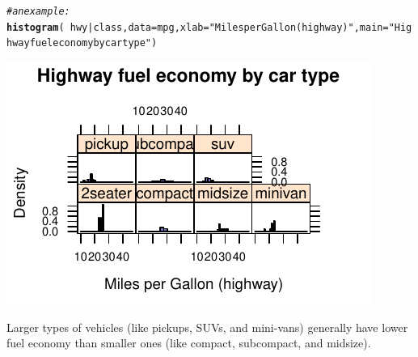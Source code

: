 \documentclass[twoside]{book}\usepackage[]{graphicx}\usepackage[]{xcolor}
\makeatletter
\def\maxwidth{ %
  \ifdim\Gin@nat@width>\linewidth
    \linewidth
  \else
    \Gin@nat@width
  \fi
}
\newcommand{\hlstr}[1]{\textcolor[rgb]{0.192,0.494,0.8}{#1}}%
\newcommand{\hlcom}[1]{\textcolor[rgb]{0.678,0.584,0.686}{\textit{#1}}}%
\newcommand{\hlopt}[1]{\textcolor[rgb]{0,0,0}{#1}}%
\newcommand{\hlstd}[1]{\textcolor[rgb]{0.345,0.345,0.345}{#1}}%
\newcommand{\hlkwc}[1]{\textcolor[rgb]{0.333,0.667,0.333}{#1}}%
\newcommand{\hlkwd}[1]{\textcolor[rgb]{0.737,0.353,0.396}{\textbf{#1}}}%
\newenvironment{kframe}{%
 \def\at@end@of@kframe{}%
 \ifinner\ifhmode%
  \def\at@end@of@kframe{\end{minipage}}%
  \begin{minipage}{\columnwidth}%
 \fi\fi%
 \def\FrameCommand##1{\hskip\@totalleftmargin \hskip-\fboxsep
 \colorbox{shadecolor}{##1}\hskip-\fboxsep
     \hskip-\linewidth \hskip-\@totalleftmargin \hskip\columnwidth}%
 \MakeFramed {\advance\hsize-\width
   \@totalleftmargin\z@ \linewidth\hsize
   \@setminipage}}%
 {\par\unskip\endMakeFramed%
 \at@end@of@kframe}
\newenvironment{knitrout}{}{} %
\newcounter{example}[section]
\makeatother
\begin{document}
\begin{solution}
\begin{knitrout}
\color{fgcolor}\begin{kframe}
\begin{alltt}
\hlcom{# an example:}
\hlkwd{histogram}\hlstd{(}\hlopt{~}\hlstd{hwy} \hlopt{|} \hlstd{class,} \hlkwc{data} \hlstd{= mpg,} \hlkwc{xlab} \hlstd{=} \hlstr{"Miles per Gallon (highway)"}\hlstd{,} \hlkwc{main} \hlstd{=} \hlstr{"Highway fuel economy by car type"}\hlstd{)}
\end{alltt}
\end{kframe}

{\centering \includegraphics[width=\maxwidth]{figures/fig-unnamed-chunk-28-1} 

}



\end{knitrout}
Larger types of vehicles (like pickups, SUVs, and mini-vans) generally have lower fuel economy than smaller ones (like compact, subcompact, and midsize).
\end{solution}
\end{document}
